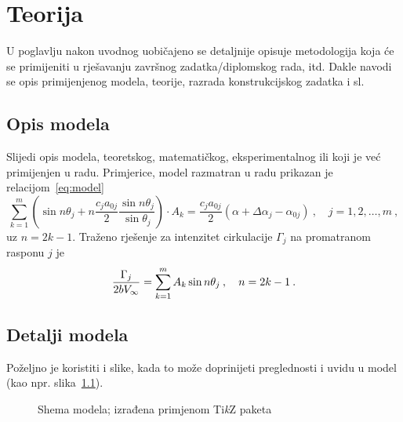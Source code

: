 \chapter{Teorija}

U poglavlju nakon uvodnog uobičajeno se detaljnije opisuje
metodologija koja će se primijeniti u rješavanju završnog zadatka/diplomskog
rada, itd. Dakle navodi se opis primijenjenog modela, teorije, razrada
konstrukcijskog zadatka i sl.

\section{Opis modela}
Slijedi opis modela, teoretskog, matematičkog, eksperimentalnog ili koji je već
primijenjen u radu. Primjerice, model razmatran u radu prikazan je
relacijom~\eqref{eq:model}
\begin{equation}\label{eq:model}
\sum\limits_{k = 1}^m {\left( {\sin n\theta_j + n\frac{c_j a_{0j}}{2} \frac{\sin n\theta_j}
{\sin \theta_j}} \right)} \cdot A_k = \frac{c_j a_{0j}}{2} \left( {\alpha + \Delta\alpha_j - \alpha_{0j} } \right)\:,\quad j = 1,2,\ldots,m\:,
\end{equation} 
%
%
%
%
%
%
%
%
%
uz $n = 2k - 1$. Traženo rješenje za intenzitet cirkulacije $\Gamma_j$ na
promatranom rasponu $j$ je
\begin{equation} 
\frac{\Gamma_j}{{2b\hbox{$V_{\infty}$}}} = \sum_{k=1}^{m}{A_k\sin{n\theta_j}}\:,\quad n=2k-1\:.
\end{equation} 
%
%
%

\section{Detalji modela}
Poželjno je koristiti i slike, kada to može doprinijeti preglednosti i uvidu u model (kao
npr. slika~\ref{fig:model}). 
%
\begin{figure}[H]
	\centering
{}
\caption{Shema modela; izrađena primjenom Ti\textit{k}Z paketa}
	\label{fig:model}
\end{figure}

